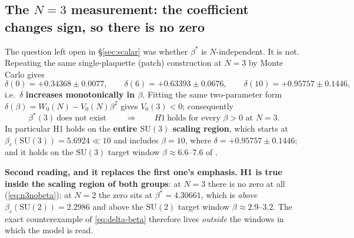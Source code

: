\subsection{The $N=3$ measurement: the coefficient changes sign, so there is no zero}

The question left open in \S\ref{sec:scalar} was whether $\beta^{*}$ is $N$-independent. It is not.
Repeating the same single-plaquette (patch) construction at $N=3$ by Monte Carlo gives
\begin{equation}
  \delta(0)=+0.34368\pm0.0077,\qquad
  \delta(6)=+0.63393\pm0.0676,\qquad
  \delta(10)=+0.95757\pm0.1446 ,
  \label{eq:n3}
\end{equation}
i.e.\ $\delta$ \textbf{increases monotonically in $\beta$}. Fitting the same two-parameter form
$\delta(\beta)=W_0(N)-V_0(N)\beta^{2}$ gives $V_0(3)<0$; consequently
\begin{equation}
  \boxed{\;\beta^{*}(3)\ \text{does not exist}\;}
  \qquad\Longrightarrow\qquad
  H1\ \text{holds for every }\beta>0\text{ at }N=3 .
  \label{eq:n3nobeta}
\end{equation}
In particular H1 holds on the \textbf{entire $\mathrm{SU}(3)$ scaling region}, which starts at
$\beta_c(\mathrm{SU}(3))=5.6924 \ll 10$ and includes $\beta=10$, where
$\delta=+0.95757\pm0.1446$; and it holds on the $\mathrm{SU}(3)$ target window $\beta\approx6.6$--$7.6$
of . \LE
{}

\begin{keybox}
\textbf{Second reading, and it replaces the first one's emphasis.} \textbf{H1 is true inside the
scaling region of both groups}: at $N=3$ there is no zero at all (\eqref{eq:n3nobeta}); at $N=2$ the
zero sits at $\beta^{*}=4.30661$, which is \emph{above} $\beta_c(\mathrm{SU}(2))=2.2986$ and above the
$\mathrm{SU}(2)$ target window $\beta\approx2.9$--$3.2$. The exact counterexample of
\eqref{eq:delta-beta} therefore lives \emph{outside} the windows in which the model is read. \LE
\end{keybox}

